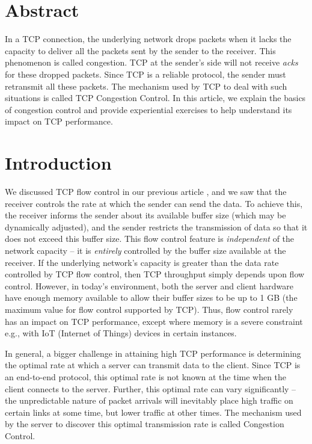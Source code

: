 \begin{multicols}{2}

\section*{Abstract} 

In a TCP connection, the underlying network drops packets when it lacks the capacity to deliver all the packets sent by the sender to the receiver. This phenomenon is called congestion. TCP at the sender’s side will not receive \textit{acks} for these dropped packets. Since TCP is a reliable protocol, the sender must retransmit all these packets. The mechanism used by TCP to deal with such situations is called TCP Congestion Control. In this article, we explain the basics of congestion control and provide experiential exercises to help understand its impact on TCP performance.

\section{Introduction}

We discussed TCP flow control in our previous article \cite{art2-key01}, and we saw that the receiver controls the rate at which the sender can send the data. To achieve this, the receiver informs the sender about its available buffer size (which may be dynamically adjusted), and the sender restricts the transmission of data so that it does not exceed this buffer size. This flow control feature is \textit{independent} of the network capacity – it is \textit{entirely} controlled by the buffer size available at the receiver. If the underlying network’s capacity is greater than the data rate controlled by TCP flow control, then TCP throughput simply depends upon flow control. However, in today’s environment, both the server and client hardware have enough memory available to allow their buffer sizes to be up to 1 GB (the maximum value for flow control supported by TCP). Thus, flow control rarely has an impact on TCP performance, except where memory is a severe constraint e.g., with IoT (Internet of Things) devices in certain instances.

In general, a bigger challenge in attaining high TCP performance is determining the optimal rate at which a server can transmit data to the client. Since TCP \cite{art2-key02} is an end-to-end protocol, this optimal rate is not known at the time when the client connects to the server. Further, this optimal rate can vary significantly – the unpredictable nature of packet arrivals will inevitably place high traffic on certain links at some time, but lower traffic at other times. The mechanism used by the server to discover this optimal transmission rate is called Congestion Control.


\end{multicols}
